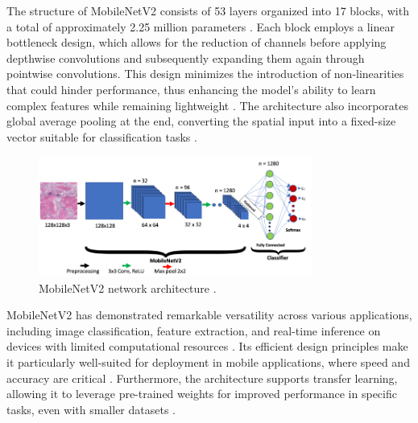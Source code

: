 The structure of MobileNetV2 consists of 53 layers organized into 17 blocks, with a total of approximately 2.25 million parameters \cite{10.1109/ojemb.2021.3066097,10.1002/cpe.7405}. Each block employs a linear bottleneck design, which allows for the reduction of channels before applying depthwise convolutions and subsequently expanding them again through pointwise convolutions. This design minimizes the introduction of non-linearities that could hinder performance, thus enhancing the model's ability to learn complex features while remaining lightweight \cite{10.21203/rs.3.rs-4523549/v1,10.3389/fpls.2023.1321877}. The architecture also incorporates global average pooling at the end, converting the spatial input into a fixed-size vector suitable for classification tasks \cite{10.3389/fpls.2023.1321877,10.1109/cvpr.2018.00474}.


\begin{figure}[H]
    \centering
    \includegraphics[width=0.8\textwidth]{images/figure6.png}
    \caption{MobileNetV2 network architecture \cite{10.1109/ojemb.2021.3066097}.}
    \label{fig:fig5}
  \end{figure}

MobileNetV2 has demonstrated remarkable versatility across various applications, including image classification, feature extraction, and real-time inference on devices with limited computational resources \cite{10.21203/rs.3.rs-4496133/v1,10.55927/mudima.v3i9.5924}. Its efficient design principles make it particularly well-suited for deployment in mobile applications, where speed and accuracy are critical \cite{10.55927/mudima.v3i9.5924,10.5109/6792818}. Furthermore, the architecture supports transfer learning, allowing it to leverage pre-trained weights for improved performance in specific tasks, even with smaller datasets \cite{10.1109/ojemb.2021.3066097,10.55927/mudima.v3i9.5924,10.14569/ijacsa.2023.01406105}.

